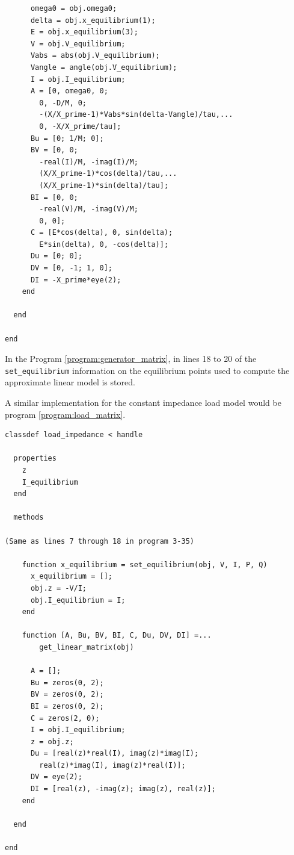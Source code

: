 \documentclass[tombow,dvipdfmx]{corona-a5-1.1}
\begin{document}
\begin{例}
\begin{PROGRAMA}[count,title={generator.m}]
\begin{verbatim}
      omega0 = obj.omega0;
      delta = obj.x_equilibrium(1);
      E = obj.x_equilibrium(3);
      V = obj.V_equilibrium;
      Vabs = abs(obj.V_equilibrium);
      Vangle = angle(obj.V_equilibrium);
      I = obj.I_equilibrium;
      A = [0, omega0, 0;
        0, -D/M, 0;
        -(X/X_prime-1)*Vabs*sin(delta-Vangle)/tau,...
        0, -X/X_prime/tau];
      Bu = [0; 1/M; 0];
      BV = [0, 0;
        -real(I)/M, -imag(I)/M;
        (X/X_prime-1)*cos(delta)/tau,...
        (X/X_prime-1)*sin(delta)/tau];
      BI = [0, 0;
        -real(V)/M, -imag(V)/M;
        0, 0];
      C = [E*cos(delta), 0, sin(delta);
        E*sin(delta), 0, -cos(delta)];
      Du = [0; 0];
      DV = [0, -1; 1, 0];
      DI = -X_prime*eye(2);
    end

  end

end
\end{verbatim}
\end{PROGRAMA}


In the Program \ref{program:generator_matrix}, in lines 18 to 20 of the \verb|set_equilibrium| information on the equilibrium points used to compute the approximate linear model is stored.

A similar implementation for the constant impedance load model would be program \ref{program:load_matrix}.

\smallskip
\begin{PROGRAMA}[count,title={load\_impedance.m}]\label{program:load_matrix}
\begin{verbatim}
classdef load_impedance < handle
  
  properties
    z
    I_equilibrium
  end
  
  methods

(Same as lines 7 through 18 in program 3-35)
   
    function x_equilibrium = set_equilibrium(obj, V, I, P, Q)
      x_equilibrium = [];
      obj.z = -V/I;
      obj.I_equilibrium = I;
    end
    
    function [A, Bu, BV, BI, C, Du, DV, DI] =...
        get_linear_matrix(obj)
      
      A = [];
      Bu = zeros(0, 2);
      BV = zeros(0, 2);
      BI = zeros(0, 2);
      C = zeros(2, 0);
      I = obj.I_equilibrium;
      z = obj.z;
      Du = [real(z)*real(I), imag(z)*imag(I);
        real(z)*imag(I), imag(z)*real(I)];
      DV = eye(2);
      DI = [real(z), -imag(z); imag(z), real(z)];
    end
    
  end
  
end
\end{verbatim}
\end{PROGRAMA}


\end{例}
\end{document}
